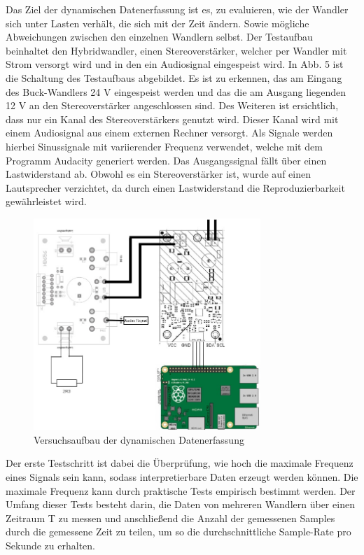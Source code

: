 Das Ziel der dynamischen Datenerfassung ist es, zu evaluieren, wie der Wandler sich unter Lasten verhält, die sich mit der Zeit ändern. Sowie mögliche Abweichungen zwischen den einzelnen Wandlern selbst. Der Testaufbau beinhaltet den Hybridwandler, einen Stereoverstärker, welcher per Wandler mit Strom versorgt wird und in den ein Audiosignal eingespeist wird. In Abb. 5 ist die Schaltung des Testaufbaus abgebildet. Es ist zu erkennen, das am Eingang des Buck-Wandlers 24 V eingespeist werden und das die am Ausgang liegenden 12 V an den Stereoverstärker angeschlossen sind. Des Weiteren ist ersichtlich, dass nur ein Kanal des Stereoverstärkers genutzt wird. Dieser Kanal wird mit einem Audiosignal aus einem externen Rechner versorgt. Als Signale werden hierbei Sinussignale mit variierender Frequenz verwendet, welche mit dem Programm Audacity generiert werden. Das Ausgangssignal fällt über einen Lastwiderstand ab. Obwohl es ein Stereoverstärker ist, wurde auf einen Lautsprecher verzichtet, da durch einen Lastwiderstand die Reproduzierbarkeit gewährleistet wird. 


\begin{figure}[H]
    \centering
    \includegraphics[height= 8cm, width = \textwidth]{Pictures/Dyn_Schaltung.jpg}
    \caption{Versuchsaufbau der dynamischen Datenerfassung}
\end{figure}

Der erste Testschritt ist dabei die Überprüfung, wie hoch die maximale Frequenz eines Signals sein kann, sodass interpretierbare Daten erzeugt werden können. Die maximale Frequenz kann durch praktische Tests empirisch bestimmt werden. Der Umfang dieser Tests besteht darin, die Daten von mehreren Wandlern über einen Zeitraum T zu messen und anschließend die Anzahl der gemessenen Samples durch die gemessene Zeit zu teilen, um so die durchschnittliche Sample-Rate pro Sekunde zu erhalten. 


